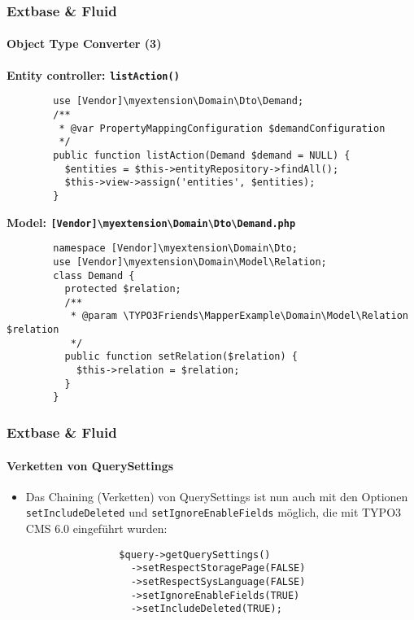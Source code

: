 \begin{frame}[fragile]
	\frametitle{Extbase \& Fluid}
	\framesubtitle{Object Type Converter (3)}

	\lstset{
		basicstyle=\tiny\ttfamily
	}

	\smaller\textbf{Entity controller: \texttt{listAction()}}\normalsize
	\begin{lstlisting}
		use [Vendor]\myextension\Domain\Dto\Demand;
		/**
		 * @var PropertyMappingConfiguration $demandConfiguration
		 */
		public function listAction(Demand $demand = NULL) {
		  $entities = $this->entityRepository->findAll();
		  $this->view->assign('entities', $entities);
		}
	\end{lstlisting}

	\smaller\textbf{Model: \texttt{[Vendor]\textbackslash myextension\textbackslash Domain\textbackslash Dto\textbackslash Demand.php}}\normalsize
	\begin{lstlisting}
		namespace [Vendor]\myextension\Domain\Dto;
		use [Vendor]\myextension\Domain\Model\Relation;
		class Demand {
		  protected $relation;
		  /**
		   * @param \TYPO3Friends\MapperExample\Domain\Model\Relation $relation
		   */
		  public function setRelation($relation) {
		    $this->relation = $relation;
		  }
		}
	\end{lstlisting}

\end{frame}


\begin{frame}[fragile]
	\frametitle{Extbase \& Fluid}
	\framesubtitle{Verketten von QuerySettings}

	\lstset{
		basicstyle=\tiny\ttfamily
	}

	\begin{itemize}
		\item Das Chaining (Verketten) von QuerySettings ist nun auch mit den Optionen
			\texttt{setIncludeDeleted} und \texttt{setIgnoreEnableFields} möglich,
			die mit TYPO3 CMS 6.0 eingeführt wurden:

			\begin{lstlisting}
				$query->getQuerySettings()
				  ->setRespectStoragePage(FALSE)
				  ->setRespectSysLanguage(FALSE)
				  ->setIgnoreEnableFields(TRUE)
				  ->setIncludeDeleted(TRUE);
			\end{lstlisting}
	\end{itemize}

\end{frame}

